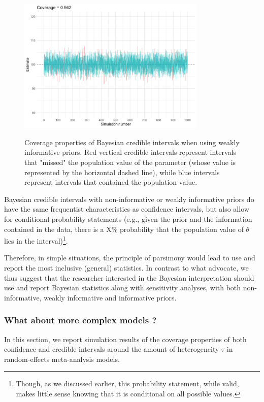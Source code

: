 \documentclass[a4paper,man,natbib,floatsintext,donotrepeattitle]{apa6}
\begin{document}
\begin{figure}[H]
  \caption{Coverage properties of Bayesian credible intervals when using weakly informative priors. Red vertical credible intervals represent intervals that "missed" the population value of the parameter (whose value is represented by the horizontal dashed line), while blue intervals represent intervals that contained the population value.}
  \centering
  \includegraphics[width=0.8\textwidth]{coverage.png}
  \label{fig:coverage}
\end{figure}

Bayesian credible intervals with non-informative or weakly informative priors do have the same frequentist characteristics as confidence intervals, but also allow for conditional probability statements (e.g., given the prior and the information contained in the data, there is a X\% probability that the population value of $\theta$ lies in the interval)\footnote{Though, as we discussed earlier, this probability statement, while valid, makes little sense knowing that it is conditional on all possible values.}.

Therefore, in simple situations, the principle of parsimony would lead to use and report the most inclusive (general) statistics. In contrast to what \cite{albers_credible_2018} advocate, we thus suggest that the researcher interested in the Bayesian interpretation should use and report Bayesian statistics along with sensitivity analyses, with both non-informative, weakly informative and informative priors.

\subsubsection{What about more complex models ?}

In this section, we report simulation results of the coverage properties of both confidence and credible intervals around the amount of heterogeneity $\tau$ in random-effects meta-analysis models.
\end{document}
